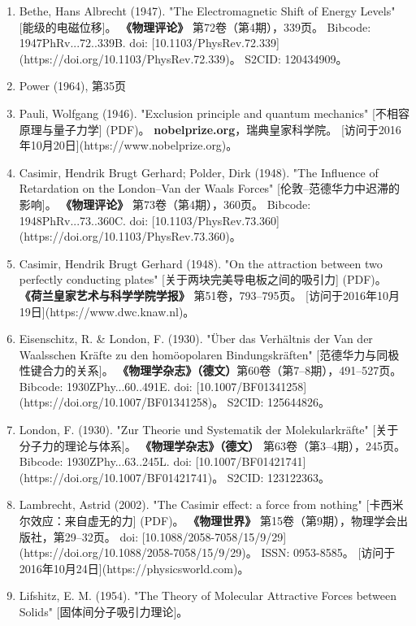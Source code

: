 \begin{enumerate}
\item Bethe, Hans Albrecht (1947). 
  "The Electromagnetic Shift of Energy Levels" [能级的电磁位移]。  
  \textbf{《物理评论》} 第72卷（第4期），339页。  
  Bibcode: 1947PhRv...72..339B.  
  doi: [10.1103/PhysRev.72.339](https://doi.org/10.1103/PhysRev.72.339)。  
  S2CID: 120434909。  
\item Power (1964), 第35页 
\item Pauli, Wolfgang (1946).  
  "Exclusion principle and quantum mechanics" [不相容原理与量子力学] (PDF)。  
  \textbf{nobelprize.org}，瑞典皇家科学院。  
  [访问于2016年10月20日](https://www.nobelprize.org)。  
\item Casimir, Hendrik Brugt Gerhard; Polder, Dirk (1948). 
  "The Influence of Retardation on the London–Van der Waals Forces" [伦敦–范德华力中迟滞的影响]。  
  \textbf{《物理评论》} 第73卷（第4期），360页。  
  Bibcode: 1948PhRv...73..360C.  
  doi: [10.1103/PhysRev.73.360](https://doi.org/10.1103/PhysRev.73.360)。  
\item Casimir, Hendrik Brugt Gerhard (1948).  
  "On the attraction between two perfectly conducting plates" [关于两块完美导电板之间的吸引力] (PDF)。  
  \textbf{《荷兰皇家艺术与科学学院学报》} 第51卷，793–795页。  
  [访问于2016年10月19日](https://www.dwc.knaw.nl)。  
\item Eisenschitz, R. & London, F. (1930). 
  "Über das Verhältnis der Van der Waalsschen Kräfte zu den homöopolaren Bindungskräften" [范德华力与同极性键合力的关系]。  
  \textbf{《物理学杂志》（德文）}第60卷（第7–8期），491–527页。  
  Bibcode: 1930ZPhy...60..491E.  
  doi: [10.1007/BF01341258](https://doi.org/10.1007/BF01341258)。  
  S2CID: 125644826。  
\item London, F. (1930). 
  "Zur Theorie und Systematik der Molekularkräfte" [关于分子力的理论与体系]。  
  \textbf{《物理学杂志》（德文）} 第63卷（第3–4期），245页。  
  Bibcode: 1930ZPhy...63..245L.  
  doi: [10.1007/BF01421741](https://doi.org/10.1007/BF01421741)。  
  S2CID: 123122363。  
\item Lambrecht, Astrid (2002).  
  "The Casimir effect: a force from nothing" [卡西米尔效应：来自虚无的力] (PDF)。  
  \textbf{《物理世界》} 第15卷（第9期），物理学会出版社，第29–32页。  
  doi: [10.1088/2058-7058/15/9/29](https://doi.org/10.1088/2058-7058/15/9/29)。  
  ISSN: 0953-8585。  
  [访问于2016年10月24日](https://physicsworld.com)。  
\item Lifshitz, E. M. (1954). 
  "The Theory of Molecular Attractive Forces between Solids" [固体间分子吸引力理论]。  

\end{enumerate}
